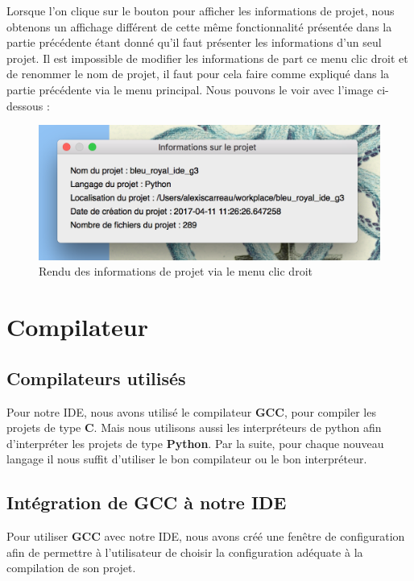 \documentclass[a4paper,12pt]{article}
\begin{document}
		
Lorsque l'on clique sur le bouton pour afficher les informations de projet, nous obtenons un affichage différent de cette même fonctionnalité présentée dans la partie précédente étant donné qu'il faut présenter les informations d'un seul projet. Il est impossible de modifier les informations de part ce menu clic droit et de renommer le nom de projet, il faut pour cela faire comme expliqué dans la partie précédente via le menu principal. Nous pouvons le voir avec l'image ci-dessous :

 \begin{figure}[h!]
			\begin{center}
				\includegraphics[scale=0.5]{images/imgs_projet/info_project4.png}
				\caption{Rendu des informations de projet via le menu clic droit}
			\end{center}
		\end{figure}


\section{Compilateur}

	\subsection{Compilateurs utilisés}

		Pour notre IDE, nous avons utilisé le compilateur \textbf{GCC}, pour compiler les projets de type \textbf{C}. Mais nous utilisons aussi les interpréteurs de python afin d'interpréter les projets de type \textbf{Python}. Par la suite, pour chaque nouveau langage il nous suffit d'utiliser le bon compilateur ou le bon interpréteur.
		
	\subsection{Intégration de \textbf{GCC} à notre IDE}

		Pour utiliser \textbf{GCC} avec notre IDE, nous avons créé une fenêtre de configuration afin de permettre à l'utilisateur de choisir la configuration adéquate à la compilation de son projet.
\end{document}

